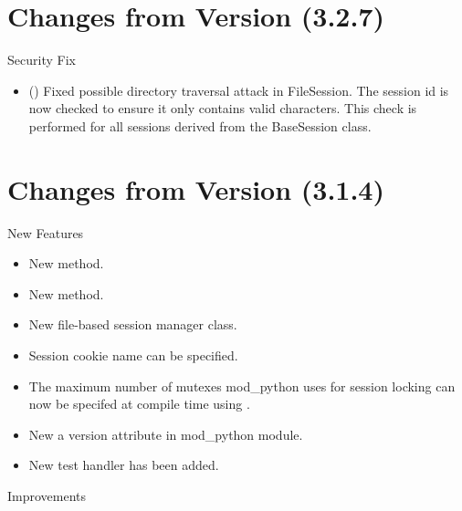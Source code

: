 \chapter{Changes from Version (3.2.7)\label{app-changes-from-3.2.7}}


  Security Fix 

  \begin{itemize}
    \item
    ()
    Fixed possible directory traversal attack in FileSession. The session
    id is now checked to ensure it only contains valid characters. This
    check is performed for all sessions derived from the BaseSession 
    class. 
  \end{itemize}

\chapter{Changes from Version (3.1.4)\label{app-changes-from-3.1.4}}

  
  New Features

  \begin{itemize}
    \item
      New  method.
    \item
      New  method.
    \item
      New file-based session manager class.
    \item
      Session cookie name can be specified.
    \item
      The maximum number of mutexes mod_python uses for session locking
      can now be specifed at compile time using 
      .
    \item
      New a version attribute in mod_python module.
    \item
      New test handler  has been added.
  \end{itemize}

  Improvements

